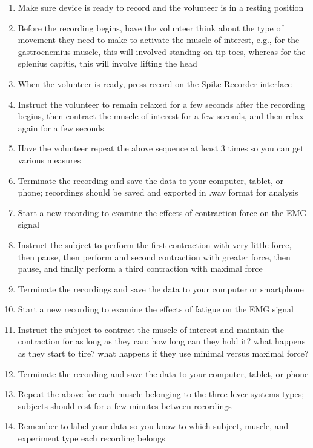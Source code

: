 \documentclass{article}
\begin{document}
\begin{enumerate}
\item Make sure device is ready to record and the volunteer is in a resting position
\item Before the recording begins, have the volunteer think about the type of movement they need to make to activate the muscle of interest, e.g., for the gastrocnemius muscle, this will involved standing on tip toes, whereas for the splenius capitis, this will involve lifting the head
\item When the volunteer is ready, press record on the Spike Recorder interface
\item Instruct the volunteer to remain relaxed for a few seconds after the recording begins, then contract the muscle of interest for a few seconds, and then relax again for a few seconds
\item Have the volunteer repeat the above sequence at least 3 times so you can get various measures
\item Terminate the recording and save the data to your computer, tablet, or phone; recordings should be saved and exported in .wav format for analysis
\item Start a new recording to examine the effects of contraction force on the EMG signal
\item Instruct the subject to perform the first contraction with very little force, then pause, then perform and second contraction with greater force, then pause, and finally perform a third contraction with maximal force
\item Terminate the recordings and save the data to your computer or smartphone
\item Start a new recording to examine the effects of fatigue on the EMG signal
\item Instruct the subject to contract the muscle of interest and maintain the contraction for as long as they can; how long can they hold it? what happens as they start to tire? what happens if they use minimal versus maximal force?
\item Terminate the recording and save the data to your computer, tablet, or phone
\item Repeat the above for each muscle belonging to the three lever systems types; subjects should rest for a few minutes between recordings
\item Remember to label your data so you know to which subject, muscle, and experiment type each recording belongs
\end{enumerate}

\clearpage

\end{document}
